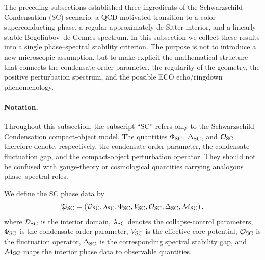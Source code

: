 \documentclass[epj]{svjour}
\begin{document}
The preceding subsections established three ingredients of the Schwarzschild
Condensation (SC) scenario: a QCD-motivated transition to a color-superconducting phase, a regular approximately de Sitter interior, and a linearly stable Bogoliubov--de Gennes spectrum. In this subsection we collect these results into a single phase--spectral stability criterion. The purpose is not to introduce a new microscopic assumption, but to make explicit the mathematical structure that connects the condensate order parameter, the regularity of the geometry, the positive perturbation spectrum, and the possible ECO echo/ringdown phenomenology.

\paragraph{Notation.}
Throughout this subsection, the subscript ``SC'' refers only to the
Schwarzschild Condensation compact-object model. The quantities
$\Phi_{\rm SC}$, $\Delta_{\rm SC}$, and $\mathcal{O}_{\rm SC}$ therefore denote, respectively, the condensate order parameter, the condensate fluctuation gap, and the compact-object perturbation operator. They should not be confused with gauge-theory or cosmological quantities carrying analogous phase--spectral roles.

We define the SC phase data by
\begin{equation}
\mathfrak{P}_{\rm SC}
=
\left(
\mathcal{D}_{\rm SC},
\lambda_{\rm SC},
\Phi_{\rm SC},
V_{\rm SC},
\mathcal{O}_{\rm SC},
\Delta_{\rm SC},
\mathcal{M}_{\rm SC}
\right),
\label{eq:SC_phase_data}
\end{equation}
where $\mathcal{D}_{\rm SC}$ is the interior domain, $\lambda_{\rm SC}$ denotes
the collapse-control parameters, $\Phi_{\rm SC}$ is the condensate order
parameter, $V_{\rm SC}$ is the effective core potential, $\mathcal{O}_{\rm SC}$
is the fluctuation operator, $\Delta_{\rm SC}$ is the corresponding spectral
stability gap, and $\mathcal{M}_{\rm SC}$ maps the interior phase data to
observable quantities.
\end{document}
